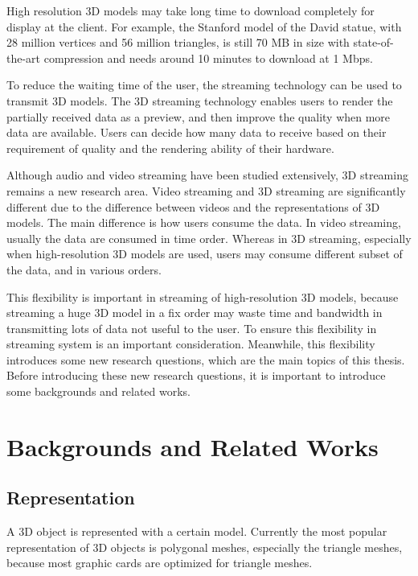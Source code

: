 \documentclass[11pt, a4paper]{report}
\begin{document}
    High resolution 3D models may take long time to download completely
    for display at the client. 
    For example, the Stanford model of the David statue, with 28 million vertices and
    56 million triangles, is still 70 MB in size with
    state-of-the-art compression \cite{alliez2001progressive} and needs around 10 minutes
    to download at 1 Mbps.
    
    To reduce the waiting time of the user, 
    the streaming technology can be used to transmit 3D models. 
    The 3D streaming technology enables users to render the partially received data as a preview, 
    and then improve the quality when more data are available. 
    Users can decide how many data to receive based on their requirement of quality
    and the rendering ability of their hardware. 

    Although audio and video streaming have been studied extensively, 
    3D streaming remains a new research area. 
    Video streaming and 3D streaming are significantly different
    due to the difference between videos and the representations of 3D models. 
    The main difference is how users consume the data.
    In video streaming, usually the data are consumed in time order. 
    Whereas in 3D streaming, especially when high-resolution 3D models are used,
    users may consume different subset of the data, and in various orders.
    
    This flexibility is important in streaming of high-resolution 3D models, 
    because streaming a huge 3D model in a fix order may waste time and bandwidth in 
    transmitting lots of data not useful to the user. 
    To ensure this flexibility in streaming system is an important consideration.
    Meanwhile, this flexibility introduces some new research questions, 
    which are the main topics of this thesis.
    Before introducing these new research questions,
    it is important to introduce some backgrounds and related works.
    
    \section{Backgrounds and Related Works}
    \subsection{Representation}
    \label{s:intro:representation}
    A 3D object is represented with a certain model.
    Currently the most popular representation of 3D objects is polygonal meshes, 
    especially the triangle meshes, because most graphic cards are optimized for triangle meshes. 
\end{document}
